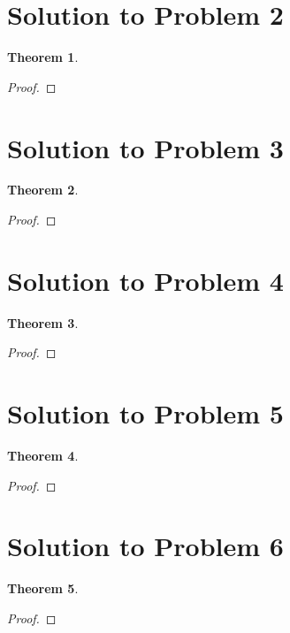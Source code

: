 \documentclass[11pt]{report}
\newcounter{problem}
\theoremstyle{definition}
\theoremstyle{plain}
\theoremstyle{plain}
\newtheorem{theorem*}{Theorem}
\begin{document}
\section*{Solution to Problem 2}

\begin{theorem*}

\end{theorem*}

\begin{proof}

\end{proof}

\pagebreak

\section*{Solution to Problem 3}

\begin{theorem*}

\end{theorem*}

\begin{proof}

\end{proof}

\pagebreak

\section*{Solution to Problem 4}

\begin{theorem*}

\end{theorem*}

\begin{proof}

\end{proof}

\pagebreak

\section*{Solution to Problem 5}

\begin{theorem*}

\end{theorem*}

\begin{proof}

\end{proof}

\pagebreak

\section*{Solution to Problem 6}

\begin{theorem*}

\end{theorem*}

\begin{proof}

\end{proof}
\end{document}
